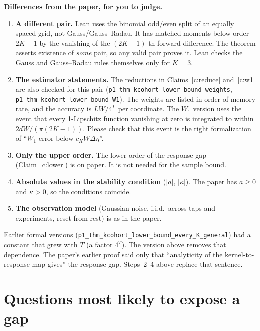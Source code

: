 \documentclass[11pt]{article}
\begin{document}
\textbf{Differences from the paper, for you to judge.}
\begin{enumerate}[leftmargin=*]
\item \textbf{A different pair.} Lean uses the binomial odd/even split of an equally spaced grid, not Gauss/Gauss--Radau. It has matched moments below order $2K-1$ by the vanishing of the $(2K-1)$-th forward difference. The theorem asserts existence of \emph{some} pair, so any valid pair proves it. Lean checks the Gauss and Gauss--Radau rules themselves only for $K=3$.
\item \textbf{The estimator statements.} The reductions in Claims~\ref{c:reduce} and~\ref{c:w1} are also checked for this pair (\texttt{p1\_thm\_kcohort\_lower\_bound\_weights}, \texttt{p1\_thm\_kcohort\_lower\_bound\_W1}). The weights are listed in order of memory rate, and the accuracy is $LW/4^L$ per coordinate. The $W_1$ version uses the event that every 1-Lipschitz function vanishing at zero is integrated to within $2dW/(\pi(2K-1))$. Please check that this event is the right formalization of ``$W_1$ error below $c_KW\Delta\eta$''.
\item \textbf{Only the upper order.} The lower order of the response gap (Claim~\ref{c:lower}) is on paper. It is not needed for the sample bound.
\item \textbf{Absolute values in the stability condition} ($|a|$, $|\kappa|$). The paper has $a\ge0$ and $\kappa>0$, so the conditions coincide.
\item \textbf{The observation model} (Gaussian noise, i.i.d.\ across taps and experiments, reset from rest) is as in the paper.
\end{enumerate}
Earlier formal versions (\texttt{p1\_thm\_kcohort\_lower\_bound\_every\_K\_general}) had a constant that grew with $T$ (a factor $4^T$). The version above removes that dependence. The paper's earlier proof said only that ``analyticity of the kernel-to-response map gives'' the response gap. Steps~2--4 above replace that sentence.

\section{Questions most likely to expose a gap}
\end{document}

